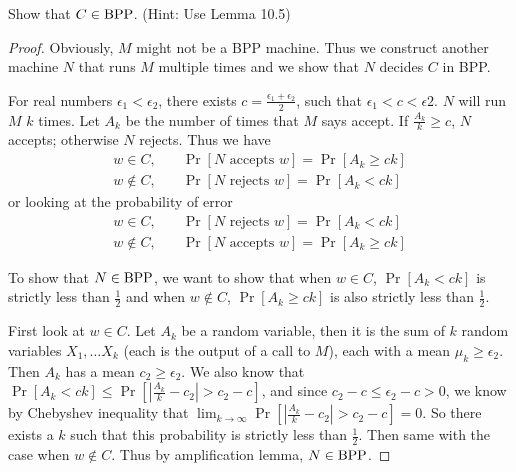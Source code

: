 Show that $C \in \text{BPP}$. (Hint: Use Lemma 10.5)
\begin{mdframed}
\begin{proof}
Obviously, $M$ might not be a BPP machine. Thus we construct another machine $N$ that runs $M$ multiple times and we show that $N$ decides $C$ in BPP.

\medskip
For real numbers $\epsilon_1 < \epsilon_2$, there exists $c = \frac{\epsilon_1 + \epsilon_2}{2}$, such that $\epsilon_1 < c < \epsilon 2$. $N$ will run $M$ $k$ times. Let $A_k$ be the number of times that $M$ says accept. If $\frac{A_k}{k} \geq c$, $N$ accepts; otherwise $N$ rejects. Thus we have
\begin{align*}
w \in C, \quad      & \Pr[N \text{ accepts } w] = \Pr [ A_k \geq ck] \\
w \not \in C, \quad & \Pr[N \text{ rejects } w] = \Pr [ A_k < ck]
\end{align*}
or looking at the probability of error
\begin{align*}
w \in C, \quad      & \Pr[N \text{ rejects } w] = \Pr [ A_k < ck] \\
w \not \in C, \quad & \Pr[N \text{ accepts } w] = \Pr [ A_k \geq ck]
\end{align*}

To show that $N \in \text{BPP}$, we want to show that when $w \in C$, $\Pr [ A_k < ck]$ is strictly less than $\frac{1}{2}$ and when $w \not \in C$, $\Pr [ A_k \geq ck]$ is also strictly less than $\frac{1}{2}$.

\medskip
First look at $w \in C$. Let $A_k$ be a random variable, then it is the sum of $k$ random variables $X_1, \ldots X_k$ (each is the output of a call to $M$), each with a mean $\mu_k \geq \epsilon_2$. Then $A_k$ has a mean $c_2 \geq \epsilon_2$. We also know that $\Pr [ A_k < ck] \leq \Pr [ | \frac{A_k}{k} - c_2| > c_2 - c]$, and since $c_2 - c \leq \epsilon_2 - c > 0$, we know by Chebyshev inequality that $\lim_{k\rightarrow \infty} \Pr[|\frac{A_k}{k} - c_2| > c_2 -c] = 0$. So there exists a $k$ such that this probability is strictly less than $\frac{1}{2}$. Then same with the case when $w \not \in C$. Thus by amplification lemma, $N \in \text{BPP}$.
\end{proof}
\end{mdframed}

